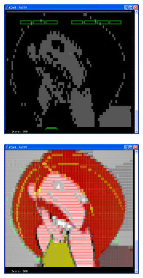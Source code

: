 \begin{figure}
	\center
	\begin{subfigure}[t]{\columnwidth}
		\center
		\begin{subfigure}{0.3\linewidth}
			\includegraphics[scale=0.3]{pictures/level_1.PNG}
		\end{subfigure}
		\begin{subfigure}{0.3\linewidth}
			\includegraphics[scale=0.3]{pictures/level_1_complete.PNG}

\end{subfigure}
\end{subfigure}
\end{figure}
